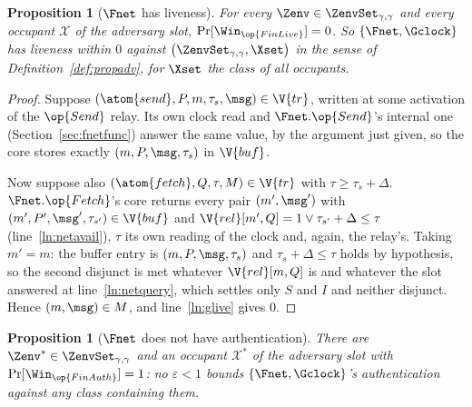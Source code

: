 \documentclass[10pt,oneside,openany]{book}
\theoremstyle{accentdef}
\theoremstyle{accentplain}
\newtheorem{proposition}[definition]{Proposition}
\begin{document}
\begin{proposition}[$\Fnet$ has liveness]\label{prop:netlive}
For every $\Zenv \in \ZenvSet_{\gamma,\gamma}$ and every occupant $\mathcal{X}$ of the adversary
slot, $\Pr[\Win_{\op{FinLive}}] = 0$. So $\{\Fnet,\Gclock\}$ has liveness within $0$ against
$\bigl(\ZenvSet_{\gamma,\gamma},\Xset\bigr)$ in the sense of Definition~\ref{def:propadv}, for
$\Xset$ the class of all occupants.
\end{proposition}

\begin{proof}
Suppose $(\atom{send},P,m,\tau_s,\msg) \in \V{tr}$, written at some activation of the $\op{Send}$
relay. Its own clock read and $\Fnet.\op{Send}$'s internal one (Section~\ref{sec:fnetfunc})
answer the same value, by the argument just given, so the core stores exactly $(m,P,\msg,\tau_s)$
in $\V{buf}$.

Now suppose also $(\atom{fetch},Q,\tau,M) \in \V{tr}$ with $\tau \geq \tau_s + \Delta$.
$\Fnet.\op{Fetch}$'s core returns every pair $(m',\msg')$ with $(m',P',\msg',\tau_{s'}) \in \V{buf}$
and $\V{rel}[m',Q] = 1 \vee \tau_{s'} + \Delta \leq \tau$ (line~\ref{ln:netavail}), $\tau$ its own
reading of the clock and, again, the relay's. Taking $m' = m$: the buffer entry is
$(m,P,\msg,\tau_s)$ and $\tau_s + \Delta \leq \tau$ holds by hypothesis, so the second disjunct is
met whatever $\V{rel}[m,Q]$ is and whatever the slot answered at line~\ref{ln:netquery}, which
settles only $S$ and $I$ and neither disjunct. Hence $(m,\msg) \in M$, and line~\ref{ln:glive}
gives $0$.
\end{proof}

\begin{proposition}[$\Fnet$ does not have authentication]\label{prop:netauth}
There are $\Zenv^{*} \in \ZenvSet_{\gamma,\gamma}$ and an occupant $\mathcal{X}^{*}$ of the
adversary slot with $\Pr[\Win_{\op{FinAuth}}] = 1$: no $\varepsilon < 1$ bounds
$\{\Fnet,\Gclock\}$'s
authentication against any class containing them.
\end{proposition}
\end{document}
